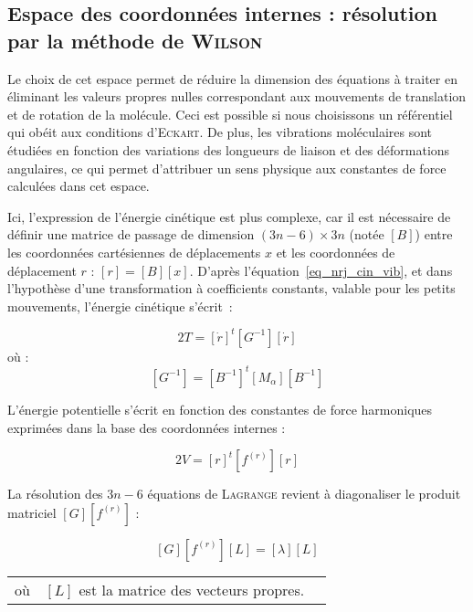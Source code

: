 \documentclass[12pt,a4paper]{book}
\begin{document}
\subsection{Espace des coordonnées internes : résolution par la méthode de \textsc{Wilson}}

Le choix de cet espace permet de réduire la dimension des équations à traiter en éliminant les valeurs propres nulles correspondant aux mouvements de translation et de rotation de la molécule. Ceci est possible si nous choisissons un référentiel qui obéit aux conditions d'\textsc{Eckart}. De plus, les vibrations moléculaires sont étudiées en fonction des variations des longueurs de liaison et des déformations angulaires, ce qui permet d'attribuer un sens physique aux constantes de force calculées dans cet espace.

Ici, l'expression de l'énergie cinétique est plus complexe, car il est nécessaire de définir une matrice de passage de dimension $(3n-6)\times3n$ (notée $\left[B\right]$) entre les coordonnées cartésiennes de déplacements $x$ et les coordonnées de déplacement $r$ : $\left[r\right] = \left[B\right]\left[x\right]$. D'après l'équation~\ref{eq_nrj_cin_vib}, et dans l'hypothèse d'une transformation à coefficients constants, valable pour les petits mouvements, l'énergie cinétique s'écrit~:

\begin{equation}
2T = \left[\dot{r}\right]^t\left[G^{-1}\right]\left[\dot{r}\right] 
\end{equation}
\noindent où :
\begin{equation}
\left[G^{-1}\right] = \left[B^{-1}\right]^t \left[M_{\alpha}\right]\left[B^{-1}\right]
\end{equation}

L'énergie potentielle s'écrit en fonction des constantes de force harmoniques exprimées dans la base des coordonnées internes :

\begin{equation}
2V = \left[r\right]^t \left[f^{(r)}\right] \left[r\right]
\end{equation}

La résolution des $3n-6$ équations de \textsc{Lagrange} revient à diagonaliser le produit matriciel $\left[G\right]\left[f^{(r)}\right]$ :

\begin{equation}
\left[G\right]\left[f^{(r)}\right]\left[L\right] = \left[\lambda\right]\left[L\right]
\end{equation}
\begin{flushleft}
	\begin{tabular}{@{}lrp{10cm}}
		où & $\left[L\right]$ est la matrice des vecteurs propres. 
	\end{tabular}
\end{flushleft}
\end{document}
